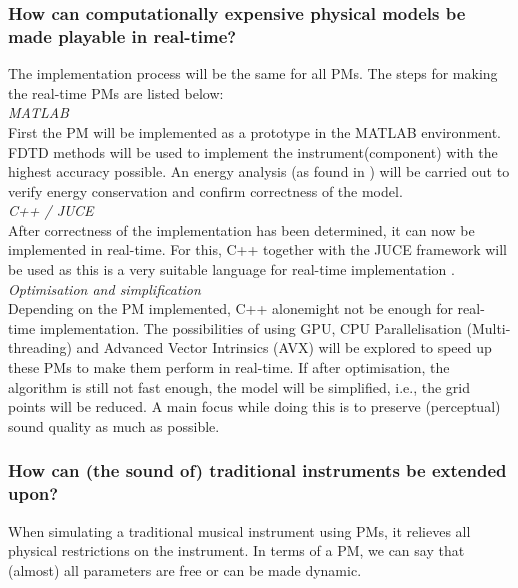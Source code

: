 \subsubsection*{How can computationally expensive physical models be made playable in real-time?}
The implementation process will be the same for all PMs. The steps for making the real-time PMs are listed below:
\\

\noindent\textit{MATLAB}
\vspace{0.15cm}
\\
\noindent First the PM will be implemented as a prototype in the MATLAB environment. FDTD methods will be used to implement the instrument(component) with the highest accuracy possible. An energy analysis (as found in \cite{Bilbao2009}) will be carried out to verify energy conservation and confirm correctness of the model.
\\

\noindent\textit{C++ / JUCE}
\vspace{0.15cm}
\\
\noindent 
After correctness of the implementation has been determined, it can now be implemented in real-time. For this, C++  together with the JUCE framework will be used as this is a very suitable language for real-time implementation \cite{Meyers2005, JUCE}.
\\

\noindent\textit{Optimisation and simplification}
\vspace{0.15cm}
\\
\noindent 
Depending on the PM implemented, C++ alonemight not be enough for real-time implementation. The possibilities of using GPU, CPU Parallelisation (Multi-threading) and Advanced Vector Intrinsics (AVX) will be explored to speed up these PMs to make them perform in real-time. If after optimisation, the algorithm is still not fast enough, the model will be simplified, i.e., the grid points will be reduced. A main focus while doing this is to preserve (perceptual) sound quality as much as possible.

\subsubsection*{How can (the sound of) traditional instruments be extended upon?}

When simulating a traditional musical instrument using PMs, it relieves all physical restrictions on the instrument. In terms of a PM, we can say that (almost) all parameters are free or can be made dynamic.


